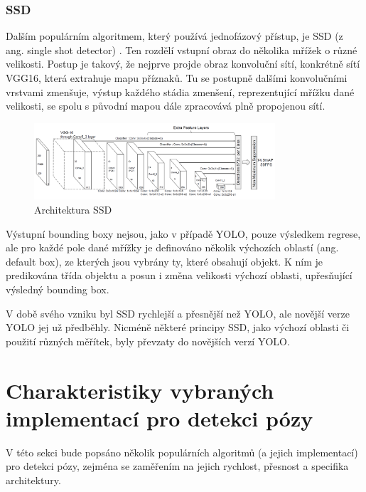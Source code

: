 \subsubsection*{SSD}
Dalším populárním algoritmem, který používá jednofázový přístup, je SSD (z ang.
single shot detector) \cite{szegedy:ssd}. Ten rozdělí vstupní obraz do několika
mřížek o různé velikosti. Postup je takový, že nejprve projde obraz konvoluční
sítí, konkrétně sítí VGG16, která extrahuje mapu příznaků. Tu se postupně
dalšími konvolučními vrstvami zmenšuje, výstup každého stádia zmenšení,
reprezentující mřížku dané velikosti, se spolu s původní mapou dále zpracovává
plně propojenou sítí.
\begin{figure}[]
    \centering
    \includegraphics[width=0.8\textwidth]{Figures/ssd.png}
    \caption{Architektura SSD \cite{szegedy:ssd}}
    \label{fig:ssd}
\end{figure}

Výstupní bounding boxy nejsou, jako v případě YOLO, pouze výsledkem regrese,
ale pro každé pole dané mřížky je definováno několik výchozích oblastí (ang.
default box), ze kterých jsou vybrány ty, které obsahují objekt. K ním je
predikována třída objektu a posun i změna velikosti výchozí oblasti,
upřesňující výsledný bounding box.

V době svého vzniku byl SSD rychlejší a přesnější než YOLO, ale novější verze
YOLO jej už předběhly. Nicméně některé principy SSD, jako výchozí oblasti či
použití různých měřítek, byly převzaty do novějších verzí YOLO.

\section{Charakteristiky vybraných implementací pro detekci pózy}

V této sekci bude popsáno několik populárních algoritmů (a jejich implementací)
pro detekci pózy, zejména se zaměřením na jejich rychlost, přesnost a specifika
architektury.


